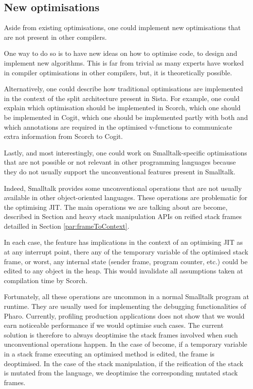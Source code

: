 \documentclass[a4paper,12pt,twoside]{../includes/ThesisStyle}
\begin{document}
\subsection{New optimisations}

Aside from existing optimisations, one could implement new optimisations that are not present in other compilers. 

One way to do so is to have new ideas on how to optimise code, to design and implement new algorithms. This is far from trivial as many experts have worked in compiler optimisations in other compilers, but, it is theoretically possible.

Alternatively, one could describe how traditional optimisations are implemented in the context of the split architecture present in Sista. For example, one could explain which optimisation should be implemented in Scorch, which one should be implemented in Cogit, which one should be implemented partly with both and which annotations are required in the optimised v-functions to communicate extra information from Scorch to Cogit. 

Lastly, and most interestingly, one could work on Smalltalk-specific optimisations that are not possible or not relevant in other programming languages because they do not usually support the unconventional features present in Smalltalk.

Indeed, Smalltalk provides some unconventional operations that are not usually available in other object-oriented languages. These operations are problematic for the optimising JIT. The main operations we are talking about are become, described in Section \label{par:become} and heavy stack manipulation APIs on reified stack frames detailled in Section \ref{par:frameToContext}. 

In each case, the feature has implications in the context of an optimising JIT as at any interrupt point, there any of the temporary variable of the optimised stack frame, or worst, any internal state (sender frame, program counter, etc.) could be edited to any object in the heap. This would invalidate all assumptions taken at compilation time by Scorch.

Fortunately, all these operations are uncommon in a normal Smalltalk program at runtime. They are usually used for implementing the debugging functionalities of Pharo. Currently, profiling production applications does not show that we would earn noticeable performance if we would optimise such cases. The current solution is therefore to always deoptimise the stack frames involved when such unconventional operations happen. In the case of become, if a temporary variable in a stack frame executing an optimised method is edited, the frame is deoptimised. In the case of the stack manipulation, if the reification of the stack is mutated from the language, we deoptimise the corresponding mutated stack frames.
\end{document}
